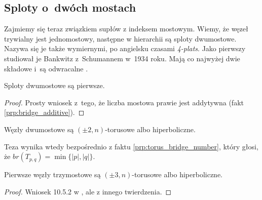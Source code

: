 
\subsection{Sploty o~dwóch mostach} %
\label{sub:twobridge}
Zajmiemy się teraz związkiem supłów z indeksem mostowym.
Wiemy, że węzeł trywialny jest jednomostowy, następne w hierarchii są sploty dwumostowe.
Nazywa się je także wymiernymi, po angielsku czasami \emph{4-plats}.
Jako pierwszy studiował je Bankwitz z~Schumannem w~1934 roku.
Mają co najwyżej dwie składowe i~są odwracalne \cite[s. 211]{burde14}.

\begin{proposition}
    Sploty dwumostowe są pierwsze.
\end{proposition}

\begin{proof}
    Prosty wniosek z~tego, że liczba mostowa prawie jest addytywna (fakt \ref{prp:bridge_additive}).
\end{proof}

\begin{corollary}
    Węzły dwumostowe są $(\pm 2, n)$-torusowe albo hiperboliczne.
\end{corollary}

\begin{tobedone}
    Teza wynika wtedy bezpośrednio z faktu \ref{prp:torus_bridge_number}, który głosi, że $br(T_{p, q}) = \min\{|p|, |q|\}$.
\end{tobedone}

\begin{proposition}
    Pierwsze węzły trzymostowe są $(\pm 3, n)$-torusowe albo hiperboliczne.
\end{proposition}

\begin{proof}
    Wniosek 10.5.2 w \cite{kawauchi96}, ale z innego twierdzenia.
\end{proof}


